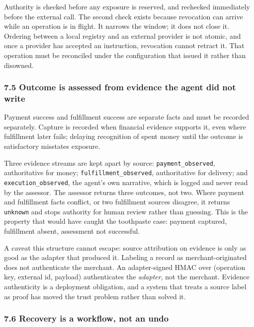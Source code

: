 \documentclass[
  11pt,
  letterpaper,
]{article}
\begin{document}
Authority is checked before any exposure is reserved, and rechecked
immediately before the external call. The second check exists because
revocation can arrive while an operation is in flight. It narrows the
window; it does not close it. Ordering between a local registry and an
external provider is not atomic, and once a provider has accepted an
instruction, revocation cannot retract it. That operation must be
reconciled under the configuration that issued it rather than disowned.

\subsubsection{7.5 Outcome is assessed from evidence the agent did not
write}\label{outcome-is-assessed-from-evidence-the-agent-did-not-write}

Payment success and fulfillment success are separate facts and must be
recorded separately. Capture is recorded when financial evidence
supports it, even where fulfillment later fails; delaying recognition of
spent money until the outcome is satisfactory misstates exposure.

Three evidence streams are kept apart by source:
\texttt{payment\_observed}, authoritative for money;
\texttt{fulfillment\_observed}, authoritative for delivery; and
\texttt{execution\_observed}, the agent's own narrative, which is logged
and never read by the assessor. The assessor returns three outcomes, not
two. Where payment and fulfillment facts conflict, or two fulfillment
sources disagree, it returns \texttt{unknown} and stops authority for
human review rather than guessing. This is the property that would have
caught the toothpaste case: payment captured, fulfillment absent,
assessment not successful.

A caveat this structure cannot escape: source attribution on evidence is
only as good as the adapter that produced it. Labeling a record as
merchant-originated does not authenticate the merchant. An
adapter-signed HMAC over (operation key, external id, payload)
authenticates the \emph{adapter}, not the merchant. Evidence
authenticity is a deployment obligation, and a system that treats a
source label as proof has moved the trust problem rather than solved it.

\subsubsection{7.6 Recovery is a workflow, not an
undo}\label{recovery-is-a-workflow-not-an-undo}
\end{document}
